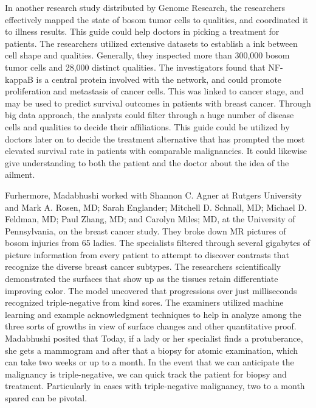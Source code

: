 \documentclass[sigconf]{acmart}
\begin{document}
In another research study distributed by Genome Research, the researchers effectively mapped the state of bosom tumor cells to qualities, and coordinated it to illness results\cite{breiman1996bagging}. This guide could help doctors in picking a treatment for patients. The researchers utilized extensive datasets to establish a ink between cell shape and qualities. Generally, they inspected more than 300,000 bosom tumor cells and 28,000 distinct qualities\cite{breiman1996bagging}.
The investigators found that NF-kappaB is a central protein involved with the network, and could promote proliferation and metastasis of cancer cells. This was linked to cancer stage, and may be used to predict survival outcomes in patients with breast cancer. Through big data approach, the analysts could filter through a huge number of disease cells and qualities to decide their affiliations. This guide could be utilized by doctors later on to decide the treatment alternative that has prompted the most elevated survival rate in patients with comparable malignancies. It could likewise give understanding to both the patient and the doctor about the idea of the ailment.

Furhermore, Madabhushi worked with Shannon C. Agner at Rutgers University and Mark A. Rosen, MD; Sarah Englander; Mitchell D. Schnall, MD; Michael D. Feldman, MD; Paul Zhang, MD; and Carolyn Miles; MD, at the University of Pennsylvania, on the breast cancer study.  They broke down MR pictures of bosom injuries from 65 ladies. The specialists filtered through several gigabytes of picture information from every patient to attempt to discover contrasts that recognize the diverse breast cancer subtypes. The researchers scientifically demonstrated the surfaces that show up as the tissues retain differentiate improving color. The model uncovered that progressions over just milliseconds recognized triple-negative from kind sores. The examiners utilized machine learning and example acknowledgment techniques to help in analyze among the three sorts of growths in view of surface changes and other quantitative proof\cite{wamba2015big}.
Madabhushi posited that Today, if a lady or her specialist finds a protuberance, she gets a mammogram and after that a biopsy for atomic examination, which can take two weeks or up to a month. In the event that we can anticipate the malignancy is triple-negative, we can quick track the patient for biopsy and treatment. Particularly in cases with triple-negative malignancy, two to a month spared can be pivotal\cite{wamba2015big}.
\end{document}
